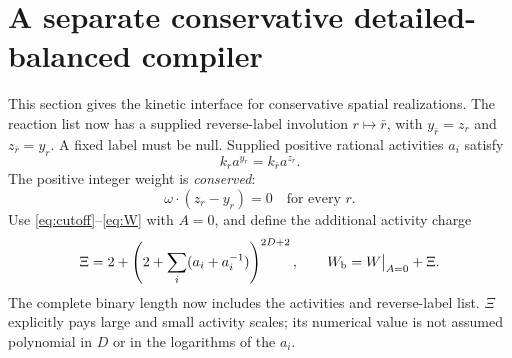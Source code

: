 \documentclass[11pt,reqno]{amsart}
\theoremstyle{definition}
\theoremstyle{remark}
\begin{document}
\section{A separate conservative detailed-balanced compiler}\label{sec:balanced}
This section gives the kinetic interface for conservative spatial
realizations. The reaction list now has a supplied reverse-label involution
$r\mapsto\bar r$, with $y_{\bar r}=z_r$ and $z_{\bar r}=y_r$. A fixed label
must be null. Supplied positive rational activities $a_i$ satisfy
\begin{equation}\label{eq:original-balance}
 k_r a^{y_r}=k_{\bar r}a^{z_r}.
\end{equation}
The positive integer weight is \emph{conserved}:
\begin{equation}\label{eq:conservative}
 \omega\cdot(z_r-y_r)=0\quad\text{for every }r.
\end{equation}
Use \eqref{eq:cutoff}--\eqref{eq:W} with $A=0$, and define the additional
activity charge
\begin{equation}\label{eq:Xi}
 \Xi=2+\left(2+\sum_i(a_i+a_i^{-1})\right)^{2D+2},
 \qquad W_{\rm b}=W\big|_{A=0}+\Xi.
\end{equation}
The complete binary length now includes the activities and reverse-label
list. $\Xi$ explicitly pays large and small activity scales; its numerical
value is not assumed polynomial in $D$ or in the logarithms of the $a_i$.
\end{document}
